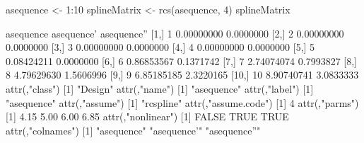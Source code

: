 \begin{Schunk}
\begin{Sinput}
 asequence <- 1:10
 splineMatrix <- rcs(asequence, 4)
 splineMatrix
\end{Sinput}
\begin{Soutput}
      asequence asequence' asequence''
 [1,]         1 0.00000000   0.0000000
 [2,]         2 0.00000000   0.0000000
 [3,]         3 0.00000000   0.0000000
 [4,]         4 0.00000000   0.0000000
 [5,]         5 0.08424211   0.0000000
 [6,]         6 0.86853567   0.1371742
 [7,]         7 2.74074074   0.7993827
 [8,]         8 4.79629630   1.5606996
 [9,]         9 6.85185185   2.3220165
[10,]        10 8.90740741   3.0833333
attr(,"class")
[1] "Design"
attr(,"name")
[1] "asequence"
attr(,"label")
[1] "asequence"
attr(,"assume")
[1] "rcspline"
attr(,"assume.code")
[1] 4
attr(,"parms")
[1] 4.15 5.00 6.00 6.85
attr(,"nonlinear")
[1] FALSE  TRUE  TRUE
attr(,"colnames")
[1] "asequence"   "asequence'"  "asequence''"
\end{Soutput}
\end{Schunk}

